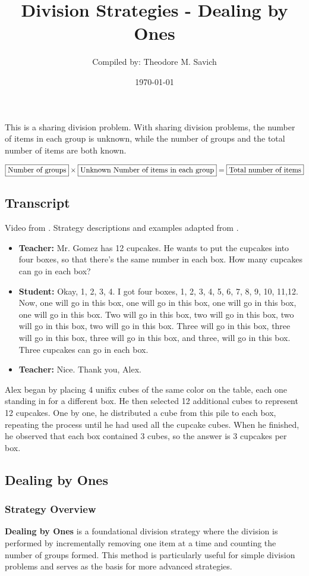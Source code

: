 \documentclass[11pt]{article}
\title{Division Strategies - Dealing by Ones}
\author{Compiled by: Theodore M. Savich}
\date{\today}
\begin{document}
\maketitle

This is a sharing division problem. With sharing division problems, the number of items in each group is unknown, while the number of groups and the total number of items are both known. 

$\fbox{Number of groups} \times \fbox{Unknown Number of items in each group}  = \fbox{Total number of items}$

\subsection*{Transcript}
Video from \textcite{Carpenter1999}. Strategy descriptions and examples adapted from \textcite{HackenbergCourseNotes}. 

\begin{itemize}
    \item \textbf{Teacher:} Mr. Gomez has 12 cupcakes. He wants to put the cupcakes into four boxes, so that there's the same number in each box. How many cupcakes can go in each box?
    \item \textbf{Student:} Okay, 1, 2, 3, 4. I got four boxes, 1, 2, 3, 4, 5, 6, 7, 8, 9, 10, 11,12. Now, one will go in this box, one will go in this box, one will go in this box, one will go in this box. Two will go in this box, two will go in this box, two will go in this box, two will go in this box. Three will go in this box, three will go in this box, three will go in this box, and three, will go in this box. Three cupcakes can go in each box. 
    \item \textbf{Teacher:} Nice. Thank you, Alex.
\end{itemize}

Alex began by placing 4 unifix cubes of the same color on the table, each one standing in for a different box. He then selected 12 additional cubes to represent 12 cupcakes. One by one, he distributed a cube from this pile to each box, repeating the process until he had used all the cupcake cubes. When he finished, he observed that each box contained 3 cubes, so the answer is 3 cupcakes per box.


\subsection*{Dealing by Ones}

\subsubsection*{Strategy Overview}
\textbf{Dealing by Ones} is a foundational division strategy where the division is performed by incrementally removing one item at a time and counting the number of groups formed. This method is particularly useful for simple division problems and serves as the basis for more advanced strategies.
\end{document}
